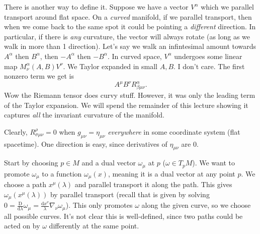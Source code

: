 There is another way to define it. Suppose we have a vector $V^\alpha $ which we parallel transport around flat space. On a \emph{curved} manifold, if we parallel transport, then when we come back to the same spot it could be pointing a \emph{different} direction. In particular, if there is \emph{any} curvature, the vector will always rotate (as long as we walk in more than 1 direction). Let's say we walk an infintesimal amount towards $A^\alpha $ then $B^\alpha $, then $-A^\alpha $ then $-B^\alpha $. In curved space, $V^\alpha $ undergoes some linear map $M^\alpha _\nu (A,B)V^\nu $. We Taylor expanded in small $A,B$. I don't care. The first nonzero term we get is
\[
	A^\mu B^\nu R^\alpha _{\beta \mu \nu } 
.\]
Wow the Riemann tensor does curvy stuff. However, it was only the leading term of the Taylor expansion. We will spend the remainder of this lecture showing it captures \emph{all} the invariant curvature of the manifold.

Clearly, $R^{\rho } _{\sigma \mu \nu } =0$ when $g_{\mu \nu } =\eta _{\mu \nu } $ \emph{everywhere} in some coordinate system (flat spacetime). One direction is easy, since derivatives of $\eta _{\mu \nu } $ are 0.

Start by choosing $p\in M$ and a dual vector $\omega _\mu $ at $p$ ($\omega \in T_pM$). We want to promote $\omega_\mu $ to a function $\omega _\mu (x)$, meaning it is a dual vector at any point $p$. We choose a path $x^\mu (\lambda )$ and parallel transport it along the path. This gives $\omega _\mu (x^\mu (\lambda ))$ by parallel transport (recall that is given by solving $0=\frac{\mathrm{D} }{\mathrm{d} \lambda } \omega _\mu =\frac{\mathrm{d} x^\nu }{\lambda } \nabla _\nu \omega _\mu $). This only promotes $\omega $ along the given curve, so we choose all possible curves. It's not clear this is well-defined, since two paths could be acted on by $\omega $ differently at the same point.

